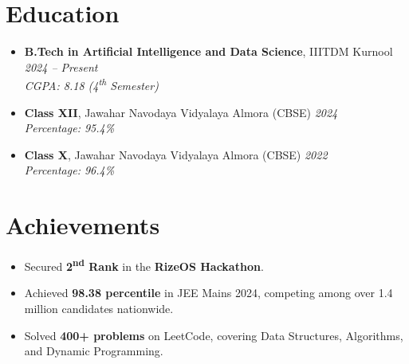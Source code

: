 \documentclass[a4paper,9pt]{extarticle}
\begin{document}
\section*{Education}
\vspace{2pt}
\begin{itemize}[leftmargin=*, itemsep=0.45em]
  \item \textbf{B.Tech in Artificial Intelligence and Data Science}, IIITDM Kurnool \hfill \textit{2024 -- Present} \\
  \hspace*{1.2em}\textit{\small CGPA: 8.18 (4\textsuperscript{th} Semester)}
  \item \textbf{Class XII}, Jawahar Navodaya Vidyalaya Almora (CBSE) \hfill \textit{2024} \\
  \hspace*{1.2em}\textit{\small Percentage: 95.4\%}
  \item \textbf{Class X}, Jawahar Navodaya Vidyalaya Almora (CBSE) \hfill \textit{2022} \\
  \hspace*{1.2em}\textit{\small Percentage: 96.4\%}
\end{itemize}

\vspace{-4pt}

\section*{Achievements}
\vspace{2pt}
\begin{itemize}[leftmargin=*, itemsep=0.06em]
  \item Secured \textbf{2\textsuperscript{nd} Rank} in the \textbf{RizeOS Hackathon}.
  \item Achieved \textbf{98.38 percentile} in JEE Mains 2024, competing among over 1.4 million candidates nationwide.
  \item Solved \textbf{400+ problems} on LeetCode, covering Data Structures, Algorithms, and Dynamic Programming.
\end{itemize}

\vspace{-4pt}

\end{document}
